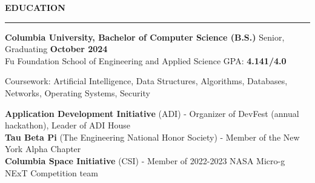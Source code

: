 \documentclass[11pt,letterpaper]{article}
\begin{document}
\medskip
\MakeUppercase{{\bf Education}}
\medskip
\hrule
\begin{list}{}{\setlength{\leftmargin}{0em}}
    \item
          {\bf Columbia University, Bachelor of Computer Science (B.S.)} \hfill  {Senior, Graduating {\bf October 2024}}\\
          Fu Foundation School of Engineering and Applied Science \hfill {GPA: {\bf 4.141/4.0}}
          
          Coursework: Artificial Intelligence, Data Structures, Algorithms, Databases, Networks, Operating Systems, Security

            {\bf Application Development Initiative} (ADI) - Organizer of DevFest (annual hackathon), Leader of ADI House \\
            {\bf Tau Beta Pi} (The Engineering National Honor Society) - Member of the New York Alpha Chapter \\
            {\bf Columbia Space Initiative} (CSI) - Member of 2022-2023 NASA Micro-g NExT Competition team
\end{list}

\end{document}
